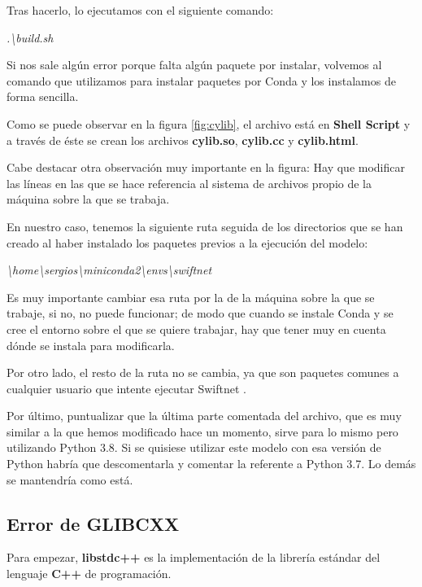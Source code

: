 Tras hacerlo, lo ejecutamos con el siguiente comando:

\begin{center}
\textit{.\textbackslash{build.sh}}
\end{center}

Si nos sale algún error porque falta algún paquete por instalar, volvemos al comando que utilizamos para instalar paquetes por Conda y los instalamos de forma sencilla.

Como se puede observar en la figura \ref{fig:cylib}, el archivo está en \textbf{Shell Script} \cite{shell} y a través de éste se crean los archivos \textbf{cylib.so}, \textbf{cylib.cc} y \textbf{cylib.html}.

Cabe destacar otra observación muy importante en la figura: Hay que modificar las líneas en las que se hace referencia al sistema de archivos propio de la máquina sobre la que se trabaja.

En nuestro caso, tenemos la siguiente ruta seguida de los directorios que se han creado al haber instalado los paquetes previos a la ejecución del modelo:

\begin{center}
\textit{\textbackslash{home}\textbackslash{sergios}\textbackslash{miniconda2}\textbackslash{envs}\textbackslash{swiftnet}}
\end{center}

Es muy importante cambiar esa ruta por la de la máquina sobre la que se trabaje, si no, no puede funcionar; de modo que cuando se instale Conda y se cree el entorno sobre el que se quiere trabajar, hay que tener muy en cuenta dónde se instala para modificarla.

Por otro lado, el resto de la ruta no se cambia, ya que son paquetes comunes a cualquier usuario que intente ejecutar Swiftnet \cite{swiftnet}.

Por último, puntualizar que la última parte comentada del archivo, que es muy similar a la que hemos modificado hace un momento, sirve para lo mismo pero utilizando Python 3.8. Si se quisiese utilizar este modelo con esa versión de Python habría que descomentarla y comentar la referente a Python 3.7. Lo demás se mantendría como está.

\subsection{Error de GLIBCXX}

Para empezar, \textbf{libstdc++} \cite{glibcxx} es la implementación de la librería estándar del lenguaje \textbf{C++} de programación.

